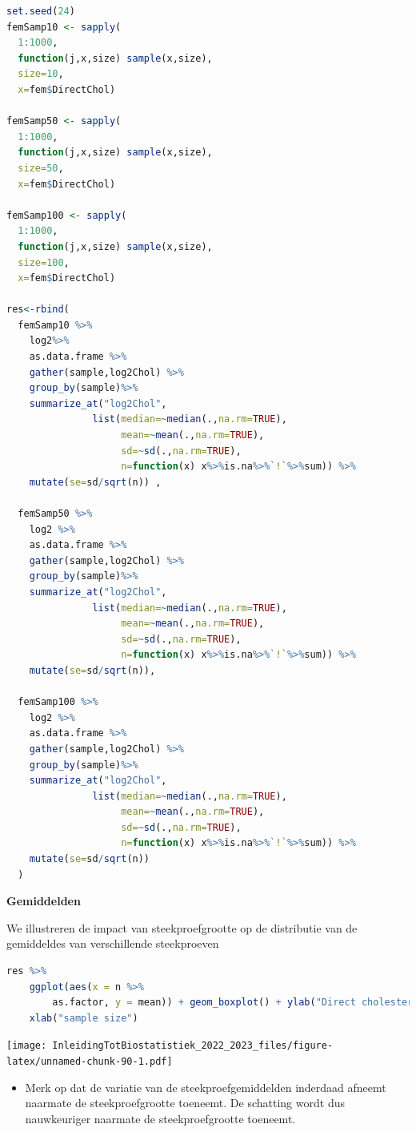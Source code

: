 \documentclass[
  12pt,dutch,coursenotes]{book}
\providecommand{\tightlist}{%
  \setlength{\itemsep}{0pt}\setlength{\parskip}{0pt}}
\begin{document}
\begin{lstlisting}[language=R]
set.seed(24)
femSamp10 <- sapply(
  1:1000,
  function(j,x,size) sample(x,size),
  size=10,
  x=fem$DirectChol)

femSamp50 <- sapply(
  1:1000,
  function(j,x,size) sample(x,size),
  size=50,
  x=fem$DirectChol)

femSamp100 <- sapply(
  1:1000,
  function(j,x,size) sample(x,size),
  size=100,
  x=fem$DirectChol)

res<-rbind(
  femSamp10 %>%
    log2%>%
    as.data.frame %>%
    gather(sample,log2Chol) %>%
    group_by(sample)%>%
    summarize_at("log2Chol",
               list(median=~median(.,na.rm=TRUE),
                    mean=~mean(.,na.rm=TRUE),
                    sd=~sd(.,na.rm=TRUE),
                    n=function(x) x%>%is.na%>%`!`%>%sum)) %>%
    mutate(se=sd/sqrt(n)) ,

  femSamp50 %>%
    log2 %>%  
    as.data.frame %>%
    gather(sample,log2Chol) %>%
    group_by(sample)%>%
    summarize_at("log2Chol",
               list(median=~median(.,na.rm=TRUE),
                    mean=~mean(.,na.rm=TRUE),
                    sd=~sd(.,na.rm=TRUE),
                    n=function(x) x%>%is.na%>%`!`%>%sum)) %>%
    mutate(se=sd/sqrt(n)),

  femSamp100 %>%
    log2 %>%
    as.data.frame %>%
    gather(sample,log2Chol) %>%
    group_by(sample)%>%
    summarize_at("log2Chol",
               list(median=~median(.,na.rm=TRUE),
                    mean=~mean(.,na.rm=TRUE),
                    sd=~sd(.,na.rm=TRUE),
                    n=function(x) x%>%is.na%>%`!`%>%sum)) %>%
    mutate(se=sd/sqrt(n))
  )
\end{lstlisting}

\textbf{Gemiddelden}

We illustreren de impact van steekproefgrootte op de distributie van de gemiddeldes van verschillende steekproeven

\begin{lstlisting}[language=R]
res %>%
    ggplot(aes(x = n %>%
        as.factor, y = mean)) + geom_boxplot() + ylab("Direct cholesterol (log2)") +
    xlab("sample size")
\end{lstlisting}

\texttt{[image: InleidingTotBiostatistiek\_2022\_2023\_files/figure-latex/unnamed-chunk-90-1.pdf]}

\begin{itemize}
\tightlist
\item
  Merk op dat de variatie van de steekproefgemiddelden inderdaad afneemt naarmate de steekproefgrootte toeneemt. De schatting wordt dus nauwkeuriger naarmate de steekproefgrootte toeneemt.
\end{itemize}
\end{document}
